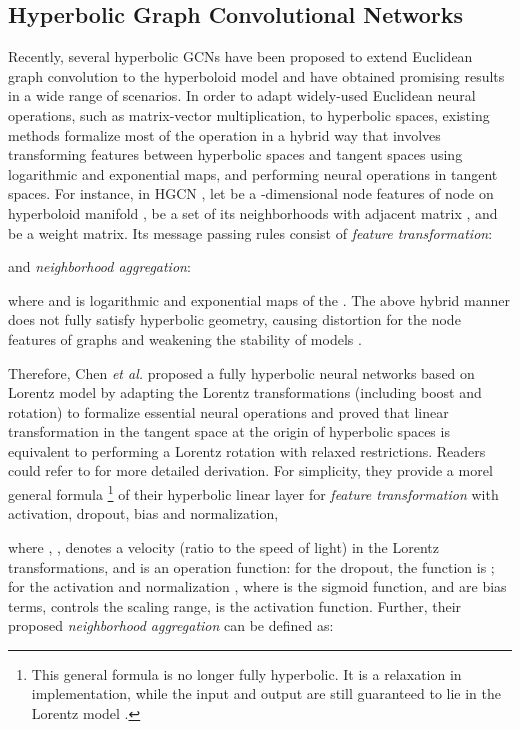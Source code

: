 \documentclass[sigconf]{acmart}
\newcommand{\etal}{{\emph{et al. }}}
\begin{document}
\subsection{Hyperbolic Graph Convolutional Networks}
Recently, several hyperbolic GCNs have been proposed to extend Euclidean graph convolution to the hyperboloid model and have obtained promising results in a wide range of scenarios\cite{c:14}. In order to adapt widely-used Euclidean neural operations, such as matrix-vector multiplication, to hyperbolic spaces, existing methods formalize most of the operation in a hybrid way that involves transforming features between hyperbolic spaces and tangent spaces using logarithmic and exponential maps, and performing neural operations in tangent spaces. For instance, in HGCN \cite{c:13}, let  be a -dimensional node features of node  on hyperboloid manifold ,  be a set of its neighborhoods with adjacent matrix , and  be a weight matrix. Its message passing rules consist of \emph{feature transformation}:

and \emph{neighborhood aggregation}:

where  and  is logarithmic and exponential maps of the . The above hybrid manner does not fully satisfy hyperbolic geometry, causing distortion for the node features of graphs and weakening the stability of models \cite{c:15, c:16}. 

Therefore, Chen \etal \cite{c:16} proposed a fully hyperbolic neural networks based on Lorentz model by adapting the Lorentz transformations (including boost and rotation) to formalize essential neural operations and proved that linear transformation in the tangent space at the origin of hyperbolic spaces is equivalent to performing a Lorentz rotation with relaxed restrictions. Readers could refer to \cite{c:16} for more detailed derivation. For simplicity, they provide a morel general formula \footnote{This general formula is no longer fully hyperbolic. It is a relaxation in implementation, while the input and output are still guaranteed to lie in the Lorentz model \cite{c:16}.} of their hyperbolic linear layer for \emph{feature transformation} with activation, dropout, bias and normalization,

where , ,  denotes a velocity (ratio to the speed of light) in the Lorentz transformations, and  is an operation function: for the dropout, the function is ; for the activation and normalization , where  is the sigmoid function,  and  are bias terms,  controls the scaling range,  is the activation function. Further, their proposed \emph{neighborhood aggregation} can be defined as:
\end{document}

